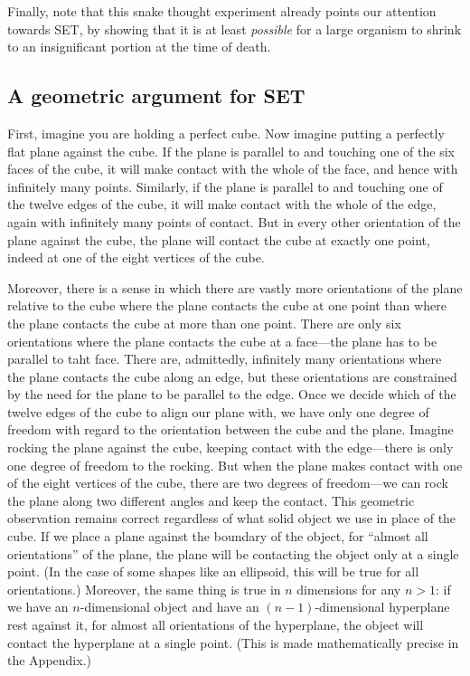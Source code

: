 Finally, note that this snake thought experiment already points our attention towards SET, by showing that it is 
at least \textit{possible} for a large organism to shrink to an insignificant portion at the time of death.  

\subsection{A geometric argument for SET}
First, imagine you are holding a perfect cube. Now imagine putting a perfectly flat plane against the cube. If the 
plane is parallel to and touching one of the six faces of the cube, it will make contact with the whole of the face, 
and hence with infinitely many points. Similarly, if the plane is parallel to and touching one of the twelve edges 
of the cube, it will make contact with the whole of the edge, again with infinitely many points of contact. But in 
every other orientation of the plane against the cube, the plane will contact the cube at exactly one point, indeed at 
one of the eight vertices of the cube. 

Moreover, there is a sense in which there are vastly more orientations of the plane relative to the cube where the 
plane contacts the cube at one point than where the plane contacts the cube at more than one point. There are only 
six orientations where the plane contacts the cube at a face---the plane has to be parallel to taht face. There are, 
admittedly, infinitely many orientations where the plane contacts the cube along an edge, but these orientations 
are constrained by the need for the plane to be parallel to the edge. Once we decide which of the twelve edges of 
the cube to align our plane with, we have only one degree of freedom with regard to the orientation between the cube 
and the plane. Imagine rocking the plane against the cube, keeping contact with the edge---there is only one degree 
of freedom to the rocking. But when the plane makes contact with one of the eight vertices of the cube, there are two 
degrees of freedom—we can rock the plane along two different angles and keep the contact. This geometric observation 
remains correct regardless of what solid object we use in place of the cube. If we place a plane against the boundary 
of the object, for ``almost all orientations'' of the plane, the plane will be contacting the object only at a single 
point. (In the case of some shapes like an ellipsoid, this will be true for all orientations.) Moreover, the same thing is 
true in $n$ dimensions for any $n>1$: if we have an $n$-dimensional object and have an $(n-1)$-dimensional hyperplane rest 
against it, for almost all orientations of the hyperplane, the object will contact the hyperplane at a single point. 
(This is made mathematically precise in the Appendix.)

